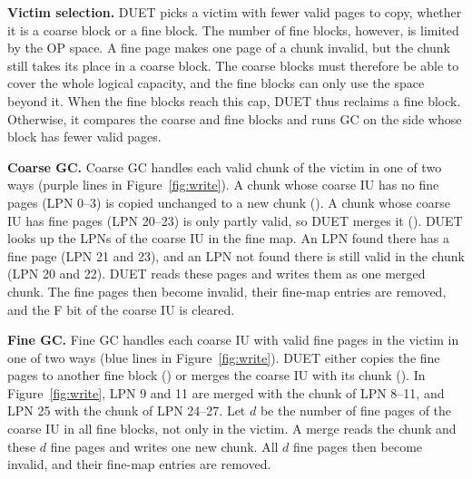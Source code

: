 \textbf{Victim selection.} DUET picks a victim with fewer valid pages to copy, whether it is a coarse
block or a fine block. The number of fine blocks, however, is limited by the OP
space. A fine page makes one page of a chunk invalid, but the chunk still takes
its place in a coarse block. The coarse blocks must therefore be able to cover
the whole logical capacity, and the fine blocks can only use the space beyond
it. When the fine blocks reach this cap, DUET thus reclaims a fine block.
Otherwise, it compares the coarse and fine blocks and runs GC on the side whose
block has fewer valid pages.

\textbf{Coarse GC.} Coarse GC handles each valid chunk of the victim in
one of two ways (purple lines in Figure~\ref{fig:write}). A chunk whose coarse
IU has no fine pages (LPN 0--3) is copied unchanged to a new chunk (). A
chunk whose coarse IU has fine pages (LPN 20--23) is only partly valid, so DUET
merges it (). DUET looks up the LPNs of the coarse IU in the fine map.
An LPN found there has a fine page (LPN 21 and 23), and an LPN not found there
is still valid in the chunk (LPN 20 and 22). DUET reads these pages and writes
them as one merged chunk. The fine pages then become invalid, their fine-map
entries are removed, and the F bit of the coarse IU is cleared.

\textbf{Fine GC.} Fine GC handles each coarse IU with valid fine pages in the victim in one of two ways
(blue lines in Figure~\ref{fig:write}). DUET either copies the fine pages to
another fine block () or merges the coarse IU with its chunk ().
In Figure~\ref{fig:write}, LPN 9 and 11 are merged with the chunk of LPN 8--11,
and LPN 25 with the chunk of LPN 24--27. Let $d$ be the number of fine pages
of the coarse IU in all fine blocks, not only in the victim. A merge reads the
chunk and these $d$ fine pages and writes one new chunk. All $d$ fine pages then
become invalid, and their fine-map entries are removed.


